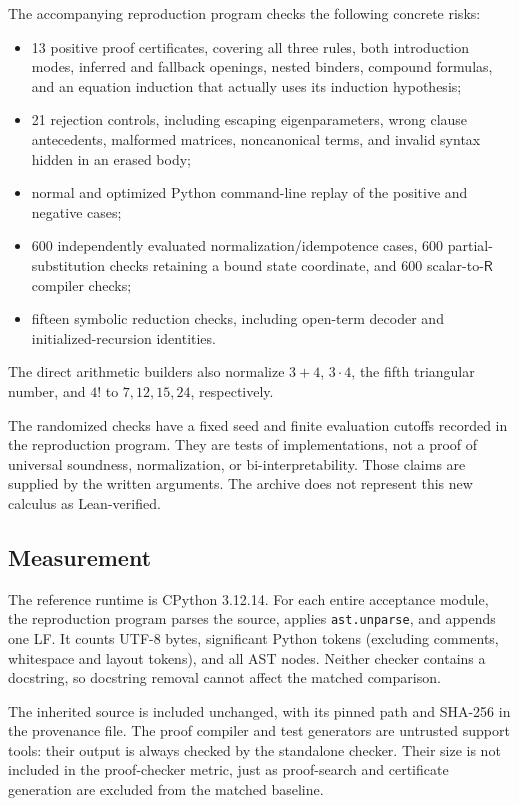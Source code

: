 \documentclass[11pt]{article}
\theoremstyle{definition}
\theoremstyle{remark}
\newcommand{\R}{\mathsf R}
\begin{document}
The accompanying reproduction program
checks the following concrete risks:
\begin{itemize}
 \item 13 positive proof certificates,
 covering all three rules, both
 introduction modes, inferred and
 fallback openings, nested binders,
 compound formulas, and an equation
 induction that actually uses its
 induction hypothesis;
 \item 21 rejection controls, including
 escaping eigenparameters, wrong clause
 antecedents, malformed matrices,
 noncanonical terms, and invalid
 syntax hidden in an erased body;
 \item normal and optimized Python
 command-line replay of the positive
 and negative cases;
 \item 600 independently evaluated
 normalization/idempotence cases,
 600 partial-substitution checks
 retaining a bound state coordinate,
 and 600 scalar-to-$\R$ compiler checks;
 \item fifteen symbolic reduction checks,
 including open-term decoder and
 initialized-recursion identities.
\end{itemize}
The direct arithmetic builders also normalize
$3+4$, $3\cdot4$, the fifth triangular
number, and $4!$ to $7,12,15,24$,
respectively.

The randomized checks have a fixed seed
and finite evaluation cutoffs recorded
in the reproduction program. They are
tests of implementations, not a proof
of universal soundness, normalization,
or bi-interpretability. Those claims
are supplied by the written arguments.
The archive does not represent this
new calculus as Lean-verified.

\subsection{Measurement}

The reference runtime is CPython 3.12.14.
For each entire acceptance module,
the reproduction program parses the
source, applies \texttt{ast.unparse},
and appends one LF. It counts UTF-8
bytes, significant Python tokens
(excluding comments, whitespace and
layout tokens), and all AST nodes.
Neither checker contains a docstring,
so docstring removal cannot affect
the matched comparison.

The inherited source is included
unchanged, with its pinned path
and SHA-256 in the provenance file.
The proof compiler and test generators
are untrusted support tools: their
output is always checked by the
standalone checker. Their size is
not included in the proof-checker
metric, just as proof-search and
certificate generation are excluded
from the matched baseline.
\end{document}
